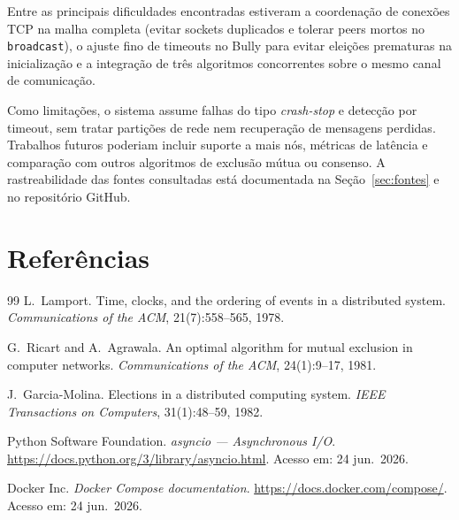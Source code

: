 \documentclass[10pt, a4paper, titlepage]{extarticle}
\begin{document}
Entre as principais dificuldades encontradas estiveram a coordenação de conexões TCP na malha completa (evitar sockets duplicados e tolerar peers mortos no \texttt{broadcast}), o ajuste fino de timeouts no Bully para evitar eleições prematuras na inicialização e a integração de três algoritmos concorrentes sobre o mesmo canal de comunicação.

Como limitações, o sistema assume falhas do tipo \emph{crash-stop} e detecção por timeout, sem tratar partições de rede nem recuperação de mensagens perdidas. Trabalhos futuros poderiam incluir suporte a mais nós, métricas de latência e comparação com outros algoritmos de exclusão mútua ou consenso. A rastreabilidade das fontes consultadas está documentada na Seção~\ref{sec:fontes} e no repositório GitHub.

\section*{Referências}
\begin{thebibliography}{99}
L.~Lamport.
\newblock Time, clocks, and the ordering of events in a distributed system.
\newblock \emph{Communications of the ACM}, 21(7):558--565, 1978.

G.~Ricart and A.~Agrawala.
\newblock An optimal algorithm for mutual exclusion in computer networks.
\newblock \emph{Communications of the ACM}, 24(1):9--17, 1981.

J.~Garcia-Molina.
\newblock Elections in a distributed computing system.
\newblock \emph{IEEE Transactions on Computers}, 31(1):48--59, 1982.

Python Software Foundation.
\newblock \emph{asyncio --- Asynchronous I/O}.
\newblock \url{https://docs.python.org/3/library/asyncio.html}.
\newblock Acesso em: 24 jun.~2026.

Docker Inc.
\newblock \emph{Docker Compose documentation}.
\newblock \url{https://docs.docker.com/compose/}.
\newblock Acesso em: 24 jun.~2026.

\end{thebibliography}
\end{document}
